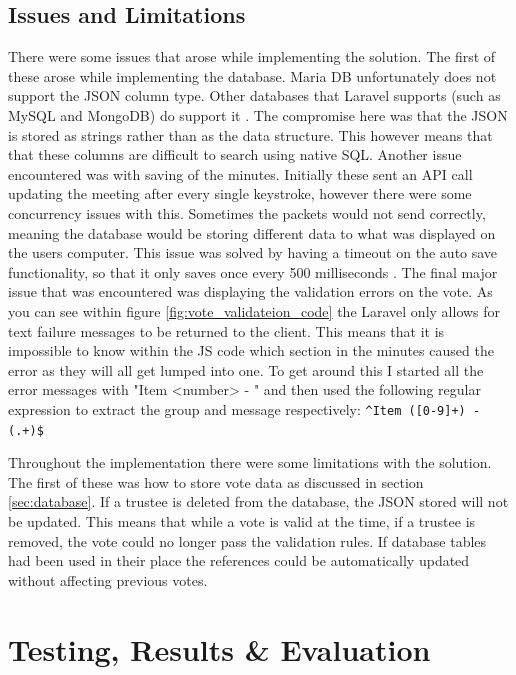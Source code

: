 \documentclass{UoYCSproject}
\begin{document}
\section{Issues and Limitations}
There were some issues that arose while implementing the solution. The first of these arose while implementing the database. Maria DB unfortunately does not support the JSON column type. Other databases that Laravel supports (such as MySQL and MongoDB) do support it \cite{quackit}. The compromise here was that the JSON is stored as strings rather than as the data structure. This however means that that these columns are difficult to search using native SQL. Another issue encountered was with saving of the minutes. Initially these sent an API call updating the meeting after every single keystroke, however there were some concurrency issues with this. Sometimes the packets would not send correctly, meaning the database would be storing different data to what was displayed on the users computer. This issue was solved by having a timeout on the auto save functionality, so that it only saves once every 500 milliseconds \cite{himanshu_2021}. The final major issue that was encountered was displaying the validation errors on the vote. As you can see within figure \ref{fig:vote_validateion_code} the Laravel only allows for text failure messages to be returned to the client. This means that it is impossible to know within the JS code which section in the minutes caused the error as they will all get lumped into one. To get around this I started all the error messages with "Item <number> - " and then used the following regular expression to extract the group and message respectively: \verb|^Item ([0-9]+) - (.+)$|

Throughout the implementation there were some limitations with the solution. The first of these was how to store vote data as discussed in section \ref{sec:database}. If a trustee is deleted from the database, the JSON stored will not be updated. This means that while a vote is valid at the time, if a trustee is removed, the vote could no longer pass the validation rules. If database tables had been used in their place the references could be automatically updated without affecting previous votes. 



\chapter{Testing, Results \& Evaluation}
\label{cha:testing}
\end{document}
